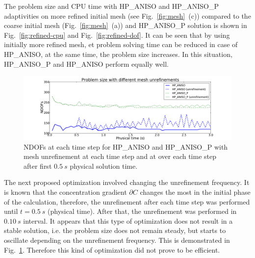 The problem size and CPU time with HP\_ANISO
and HP\_ANISO\_P adaptivities on more refined initial mesh (see Fig.~\ref{fig:mesh}~(c))
compared to the coarse initial mesh (Fig.~\ref{fig:mesh}~(a)) and 
HP\_ANISO\_P solution is shown in Fig.~\ref{fig:refined-cpu} and Fig.~\ref{fig:refined-dof}.
It can be seen that by using initially more refined mesh, et problem solving time
can be reduced in case of HP\_ANISO, at the same time, the problem size increases.
In this situation, HP\_ANISO\_P and HP\_ANISO perform equally well.

\begin{figure}
  \begin{centering}
  \includegraphics[width=\columnwidth]{unreffreq_dof}
  \caption{\label{fig:unreffreq-dof} NDOFs at each time step for
  HP\_ANISO and HP\_ANISO\_P with mesh unrefinement at each time step and at over each
  	time step after first $0.5\ s$ physical solution time.}
  \end{centering}
\end{figure}
The next proposed optimization involved changing the unrefinement frequency.
It is known that the concentration gradient $\partial C$ changes the most in the initial phase
of the calculation, therefore, the unrefinement after each time step was performed
until $t=0.5\ s$ (physical time). After that, the
unrefinement was performed in $0.10\ s$ interval.
It appears that this type
of optimization does not result in a stable solution, i.e. the problem size 
does not remain steady, but starts to oscillate depending on the unrefinement
frequency. This is demonstrated in 
Fig.~\ref{fig:unreffreq-dof}. Therefore this kind of optimization did not
prove to be efficient.

